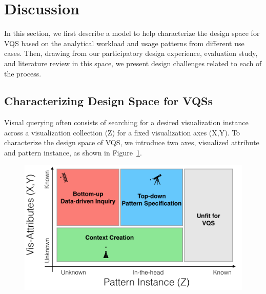 \section{Discussion\label{sec:guidelines}}
In this section, we first describe a model to help characterize the design space for VQS based on the analytical workload and usage patterns from different use cases. Then, drawing from our participatory design experience, evaluation study, and literature review in this space, we present design challenges related to each of the process.
\subsection{Characterizing Design Space for VQSs}
Visual querying often consists of searching for a desired visualization instance across a visualization collection (Z) for a fixed visualization axes (X,Y). To characterize the design space of VQS, we introduce two axes, visualized attribute and pattern instance, as shown in Figure~\ref{2dmodel}.
\begin{figure}[ht!]
  \centering
  \includegraphics[width=\linewidth]{figures/2dmodel.png}
  \caption{}
  \label{2dmodel}
\end{figure}
